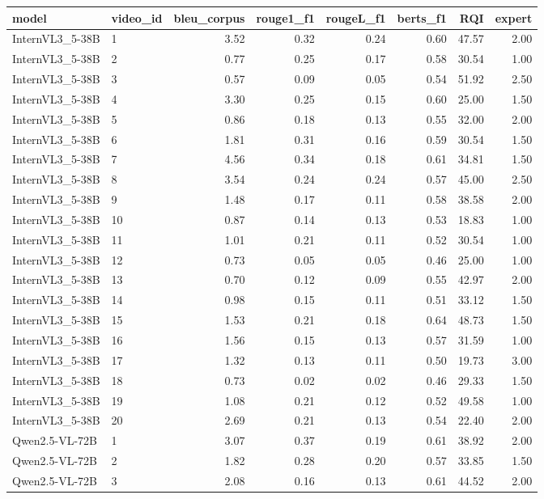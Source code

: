 \documentclass{article}
\theoremstyle{plain}
\theoremstyle{definition}
\theoremstyle{remark}
\begin{document}
\begin{table}[t]
{\begin{tabular}{llrrrrrr}
\hline
model & video\_id & bleu\_corpus & rouge1\_f1 & rougeL\_f1 & berts\_f1 & RQI &  expert\\
\hline
InternVL3\_5-38B & 1 & 3.52 & 0.32 & 0.24 & 0.60 & 47.57 & 2.00 \\
InternVL3\_5-38B & 2 & 0.77 & 0.25 & 0.17 & 0.58 & 30.54 & 1.00 \\
InternVL3\_5-38B & 3 & 0.57 & 0.09 & 0.05 & 0.54 & 51.92 & 2.50 \\
InternVL3\_5-38B & 4 & 3.30 & 0.25 & 0.15 & 0.60 & 25.00 & 1.50 \\
InternVL3\_5-38B & 5 & 0.86 & 0.18 & 0.13 & 0.55 & 32.00 & 2.00 \\
InternVL3\_5-38B & 6 & 1.81 & 0.31 & 0.16 & 0.59 & 30.54 & 1.50 \\
InternVL3\_5-38B & 7 & 4.56 & 0.34 & 0.18 & 0.61 & 34.81 & 1.50 \\
InternVL3\_5-38B & 8 & 3.54 & 0.24 & 0.24 & 0.57 & 45.00 & 2.50 \\
InternVL3\_5-38B & 9 & 1.48 & 0.17 & 0.11 & 0.58 & 38.58 & 2.00 \\
InternVL3\_5-38B & 10 & 0.87 & 0.14 & 0.13 & 0.53 & 18.83 & 1.00 \\
InternVL3\_5-38B & 11 & 1.01 & 0.21 & 0.11 & 0.52 & 30.54 & 1.00 \\
InternVL3\_5-38B & 12 & 0.73 & 0.05 & 0.05 & 0.46 & 25.00 & 1.00 \\
InternVL3\_5-38B & 13 & 0.70 & 0.12 & 0.09 & 0.55 & 42.97 & 2.00 \\
InternVL3\_5-38B & 14 & 0.98 & 0.15 & 0.11 & 0.51 & 33.12 & 1.50 \\
InternVL3\_5-38B & 15 & 1.53 & 0.21 & 0.18 & 0.64 & 48.73 & 1.50 \\
InternVL3\_5-38B & 16 & 1.56 & 0.15 & 0.13 & 0.57 & 31.59 & 1.00 \\
InternVL3\_5-38B & 17 & 1.32 & 0.13 & 0.11 & 0.50 & 19.73 & 3.00 \\
InternVL3\_5-38B & 18 & 0.73 & 0.02 & 0.02 & 0.46 & 29.33 & 1.50 \\
InternVL3\_5-38B & 19 & 1.08 & 0.21 & 0.12 & 0.52 & 49.58 & 1.00 \\
InternVL3\_5-38B & 20 & 2.69 & 0.21 & 0.13 & 0.54 & 22.40 & 2.00 \\
Qwen2.5-VL-72B & 1 & 3.07 & 0.37 & 0.19 & 0.61 & 38.92 & 2.00 \\
Qwen2.5-VL-72B & 2 & 1.82 & 0.28 & 0.20 & 0.57 & 33.85 & 1.50 \\
Qwen2.5-VL-72B & 3 & 2.08 & 0.16 & 0.13 & 0.61 & 44.52 & 2.00 \\

\end{tabular}}
\end{table}
\end{document}
